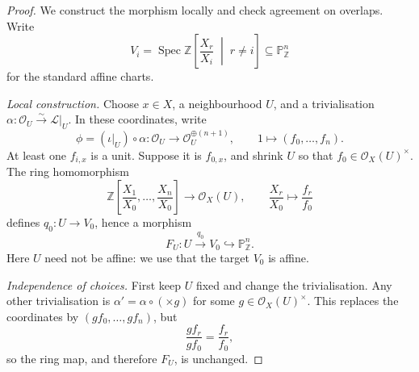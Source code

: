 \documentclass{article}
\theoremstyle{definition}
\theoremstyle{remark}
\theoremstyle{plain}
\DeclareMathOperator{\Spec}{Spec}
\newcommand{\Z}{\mathbb{Z}}
\renewcommand{\P}{\mathbb{P}}
\begin{document}
\begin{proof}
    We construct the morphism locally and check agreement on overlaps.
    Write
    \[
        V_i=\Spec\Z\left[\frac{X_r}{X_i}\;\middle|\;r\ne i\right]
        \subseteq\P^n_\Z
    \]
    for the standard affine charts.

    \emph{Local construction.}
    Choose \(x\in X\), a neighbourhood \(U\), and a trivialisation
    \(\alpha:\mathcal{O}_U\xrightarrow{\sim}\mathcal{L}|_U\).
    In these coordinates, write
    \[
        \phi=(\iota|_U)\circ\alpha:
        \mathcal{O}_U\longrightarrow\mathcal{O}_U^{\oplus(n+1)},
        \qquad 1\longmapsto(f_0,\dots,f_n).
    \]
    At least one \(f_{i,x}\) is a unit. Suppose it is \(f_{0,x}\), and
    shrink \(U\) so that \(f_0\in\mathcal{O}_X(U)^\times\).
    The ring homomorphism
    \[
        \Z\left[\frac{X_1}{X_0},\dots,\frac{X_n}{X_0}\right]
        \longrightarrow\mathcal{O}_X(U),
        \qquad \frac{X_r}{X_0}\longmapsto\frac{f_r}{f_0}
    \]
    defines \(q_0:U\to V_0\), hence a morphism
    \[
        F_U:U\xrightarrow{q_0}V_0\hookrightarrow\P^n_\Z.
    \]
    Here \(U\) need not be affine: we use that the target \(V_0\) is affine.

    \emph{Independence of choices.}
    First keep \(U\) fixed and change the trivialisation. Any other
    trivialisation is \(\alpha'=\alpha\circ(\times g)\) for some
    \(g\in\mathcal{O}_X(U)^\times\). This replaces the coordinates by
    \((gf_0,\dots,gf_n)\), but
    \[
        \frac{gf_r}{gf_0}=\frac{f_r}{f_0},
    \]
    so the ring map, and therefore \(F_U\), is unchanged.


\end{proof}
\end{document}
